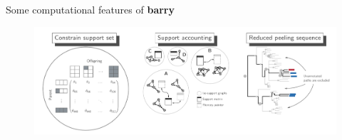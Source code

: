\documentclass[10pt,aspectratio=169]{beamer}
\newcounter{frame}[frame]
\begin{document}
\begin{frame}{Some computational features of \textbf{barry}}
\begin{figure}
    \centering
    \includegraphics[width=1\textwidth]{fig/barry-computing.png}
    \label{fig:barry}
\end{figure}
\end{frame}
\end{document}

